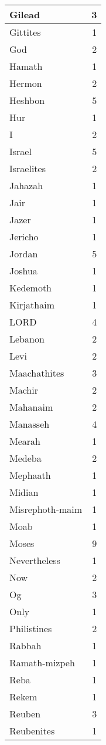 \begin{center}
\begin{longtable}{l|r}
Gilead & 3\\ \hline 
Gittites & 1\\ \hline 
God & 2\\ \hline 
Hamath & 1\\ \hline 
Hermon & 2\\ \hline 
Heshbon & 5\\ \hline 
Hur & 1\\ \hline 
I & 2\\ \hline 
Israel & 5\\ \hline 
Israelites & 2\\ \hline 
Jahazah & 1\\ \hline 
Jair & 1\\ \hline 
Jazer & 1\\ \hline 
Jericho & 1\\ \hline 
Jordan & 5\\ \hline 
Joshua & 1\\ \hline 
Kedemoth & 1\\ \hline 
Kirjathaim & 1\\ \hline 
LORD & 4\\ \hline 
Lebanon & 2\\ \hline 
Levi & 2\\ \hline 
Maachathites & 3\\ \hline 
Machir & 2\\ \hline 
Mahanaim & 2\\ \hline 
Manasseh & 4\\ \hline 
Mearah & 1\\ \hline 
Medeba & 2\\ \hline 
Mephaath & 1\\ \hline 
Midian & 1\\ \hline 
Misrephoth-maim & 1\\ \hline 
Moab & 1\\ \hline 
Moses & 9\\ \hline 
Nevertheless & 1\\ \hline 
Now & 2\\ \hline 
Og & 3\\ \hline 
Only & 1\\ \hline 
Philistines & 2\\ \hline 
Rabbah & 1\\ \hline 
Ramath-mizpeh & 1\\ \hline 
Reba & 1\\ \hline 
Rekem & 1\\ \hline 
Reuben & 3\\ \hline 
Reubenites & 1\\ \hline 

\end{longtable}
\end{center}
